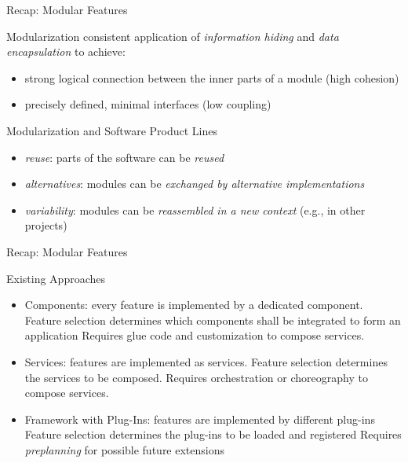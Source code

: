 \begin{frame}{Recap: Modular Features}
		\begin{definition}{Modularization}
			consistent application of \emph{information hiding} and \emph{data encapsulation} to achieve:
			\begin{itemize}
				\item strong logical connection between the inner parts of a module (high cohesion)
				\item precisely defined, minimal interfaces (low coupling)
			\end{itemize}						
		\end{definition}
		\pause
		\begin{note}{Modularization and Software Product Lines}
		\begin{itemize}
			\item \emph{reuse}: parts of the software can be {\em reused}
			\item \emph{alternatives}: modules can be {\em exchanged by alternative implementations}
			\item \emph{variability}: modules can be {\em reassembled in a new context} (e.g., in other projects)
		\end{itemize}
		\end{note}

\end{frame}

\begin{frame}{Recap: Modular Features}
	
	\begin{note}{Existing Approaches}
		\begin{itemize}
			\item Components: every feature is implemented by a dedicated component.
			\newline Feature selection determines which components shall be integrated to form an application
			\newline Requires glue code and customization to compose services.
			\item Services: features are implemented as services.
			\newline Feature selection determines the services to be composed.
			\newline Requires orchestration or choreography to compose services.
			\item Framework with Plug-Ins: features are implemented by different plug-ins
			\newline Feature selection determines the plug-ins to be loaded and registered
			\newline Requires \emph{preplanning} for possible future extensions 
		\end{itemize}
	\end{note}
\end{frame}



